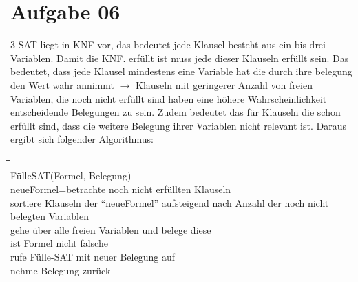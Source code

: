 \documentclass[10pt,a4paper]{article}
\begin{document}
\section*{Aufgabe 06}
    3-SAT liegt in KNF vor, das bedeutet jede Klausel
    besteht aus ein bis drei Variablen. Damit die KNF.
    erfüllt ist muss jede dieser Klauseln erfüllt sein.
    Das bedeutet, dass jede Klausel mindestens eine Variable
    hat die durch ihre belegung den Wert wahr annimmt $\rightarrow$
    Klauseln mit geringerer Anzahl von freien Variablen, die
    noch nicht erfüllt sind haben eine höhere Wahrscheinlichkeit
    entscheidende Belegungen zu sein. Zudem bedeutet das für
    Klauseln die schon erfüllt sind, dass die weitere Belegung
    ihrer Variablen nicht relevant ist.
    Daraus ergibt sich folgender Algorithmus: \\

    \begin{tabbing}
\quad\=\quad\=\quad\=\quad\=\\
FülleSAT(Formel, Belegung) \\
\>    neueFormel=betrachte noch nicht erfüllten Klauseln \\
\>\>        sortiere Klauseln der “neueFormel” aufsteigend nach Anzahl der noch nicht \\
\>\>        belegten Variablen \\
\>\>        gehe über alle freien Variablen und belege diese\\
\>\>\>            ist Formel nicht falsche\\
\>\>\>\>                rufe Fülle-SAT mit neuer Belegung auf\\
\>\>\>            nehme Belegung zurück\\
    \end{tabbing}
\end{document}
